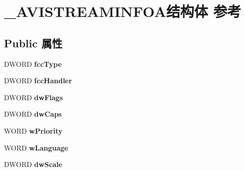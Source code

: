 \hypertarget{struct___a_v_i_s_t_r_e_a_m_i_n_f_o_a}{}\section{\+\_\+\+A\+V\+I\+S\+T\+R\+E\+A\+M\+I\+N\+F\+O\+A结构体 参考}
\label{struct___a_v_i_s_t_r_e_a_m_i_n_f_o_a}
\subsection*{Public 属性}
\begin{DoxyCompactItemize}
\item 
\mbox{\label{struct___a_v_i_s_t_r_e_a_m_i_n_f_o_a_ae87ab7f7885a9e6403e33709ae13a267}} 
D\+W\+O\+RD {\bfseries fcc\+Type}
\item 
\mbox{\label{struct___a_v_i_s_t_r_e_a_m_i_n_f_o_a_aaa787716e57c2bfd11a32e0f0323d143}} 
D\+W\+O\+RD {\bfseries fcc\+Handler}
\item 
\mbox{\label{struct___a_v_i_s_t_r_e_a_m_i_n_f_o_a_a74fb2a77c1d7ddfa1a5fd7217634e2de}} 
D\+W\+O\+RD {\bfseries dw\+Flags}
\item 
\mbox{\label{struct___a_v_i_s_t_r_e_a_m_i_n_f_o_a_a912c47d30fa807db7d4bc09c7bc4beef}} 
D\+W\+O\+RD {\bfseries dw\+Caps}
\item 
\mbox{\label{struct___a_v_i_s_t_r_e_a_m_i_n_f_o_a_a42baf1f9bb0adc17c6d04d47b973a582}} 
W\+O\+RD {\bfseries w\+Priority}
\item 
\mbox{\label{struct___a_v_i_s_t_r_e_a_m_i_n_f_o_a_a4dc8da82cd9e43abc45a9892810c9918}} 
W\+O\+RD {\bfseries w\+Language}
\item 
\mbox{\label{struct___a_v_i_s_t_r_e_a_m_i_n_f_o_a_a2a1b386101c467d21f150b031bc9d422}} 
D\+W\+O\+RD {\bfseries dw\+Scale}
\item 
\mbox{\label{struct___a_v_i_s_t_r_e_a_m_i_n_f_o_a_acdf08bf4d510cbeeafeeec777ac3bfb7}} 

\end{DoxyCompactItemize}
